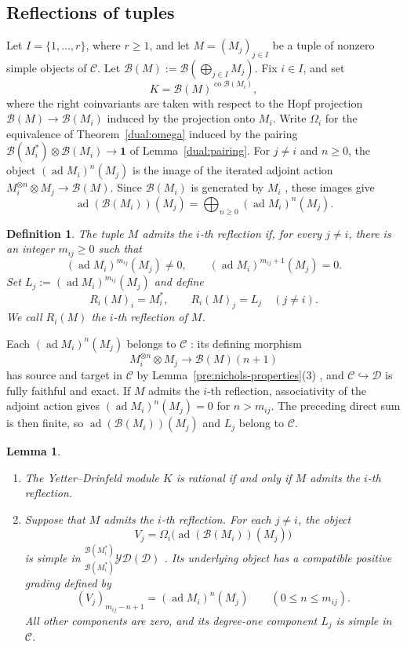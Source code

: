 \documentclass[11pt, a4paper]{article}
\numberwithin{equation}{section}
\newcommand{\C}{\mathcal C}
\newcommand{\D}{\mathcal D}
\newcommand{\B}{\mathcal B}
\newcommand{\YD}{\mathcal{YD}}
\newcommand{\one}{\mathbf 1}
\DeclareMathOperator{\ad}{ad}
\DeclareMathOperator{\co}{co}
\newtheorem{lemma}[theorem]{Lemma}
\newtheorem{definition}[theorem]{Definition}
\begin{document}
\subsection{Reflections of tuples}

Let $I=\{1,\ldots,{{r}}\}$, where ${{r}}\geq1$, and let
$M=(M_j)_{j\in I}$ be a tuple of nonzero simple objects of $\C$.
 Let
$
 \B(M):=\B\left(\bigoplus_{j\in I}M_j\right).
$
Fix $i\in I$, and set
\[
 K=\B(M)^{\co\B(M_i)},
\]
where the right coinvariants are taken with respect to the Hopf
projection $\B(M)\to\B(M_i)$ induced by the projection onto $M_i$.
Write $\Omega_i$ for the equivalence of
Theorem~\ref{dual:omega} induced by the pairing
$\B(M_i^*)\otimes\B(M_i)\to\one$ of
Lemma~\ref{dual:pairing}.
For $j\neq i$ and ${{n}}\geq0$, the object $(\ad M_i)^{{n}}(M_j)$ is the
image of the iterated adjoint action
$M_i^{\otimes {{n}}}\otimes M_j\to\B(M)$.
 {Since} $  \B(M_i)   $  {is generated by} $  M_i   $ {, these images give}
\[
 \ad(\B(M_i))(M_j)
 =\bigoplus_{{{n}}\geq0}(\ad M_i)^{{n}}(M_j).
\]

\begin{definition}\label{refl:finite}
The tuple $M$ {admits the $i$-th reflection if}, for every $j\neq i$, there is an
integer $m_{ij}\geq0$ such that
\[
 (\ad M_i)^{m_{ij}}(M_j)\neq0,\qquad
 (\ad M_i)^{m_{ij}+1}(M_j)=0.
\]
Set $L_j:=(\ad M_i)^{m_{ij}}(M_j)$ and define
\[
 R_i(M)_i=M_i^*,\qquad R_i(M)_j=L_j\quad(j\neq i)  .   
\]
We call $R_i(M)$ the $i$-th reflection of $M$.
\end{definition}

 {Each} $  (\ad M_i)^{{n}}(M_j)   $  {belongs to} $  \C   $ {: its defining morphism}
\[
 M_i^{\otimes {{n}}}\otimes M_j\longrightarrow\B(M)({{n}}+1)
\]
 {has source and target} in $\C$ by
Lemma~\ref{pre:nichols-properties}(3) {, and}
$\C  \hookrightarrow\D   $  {is fully faithful and exact}.
If $M$ {admits the $i$-th reflection}, associativity of the adjoint action gives
$(\ad M_i)^{{n}}(M_j)=0$ for ${{n}}>m_{ij}$.
 {The preceding direct sum is then finite, so}
$\ad(\B(M_i))(M_j)$  {and} $  L_j   $  {belong to} $\C$.

\begin{lemma}\label{refl:rational}
\begin{enumerate}
\item
The  {Yetter--Drinfeld module} $K$ is rational if and only if
$M$ {admits the $i$-th reflection}.

\item
Suppose that $M$ {admits the $i$-th reflection}. For each $j\neq i$, the object
\[
 V_j=\Omega_i\bigl(\ad(\B(M_i))(M_j)\bigr)
\]
is simple in ${}_{\B(M_i^*)}^{\B(M_i^*)}\YD(\D)$ {.
Its underlying object} has a compatible positive grading  {defined} by
\[
 (V_j)_{m_{ij}-{{n}}+1}=(\ad M_i)^{{n}}(M_j)
 \qquad(0\leq {{n}}\leq m_{ij}).
\]
 {All other components are zero, and its} degree-one component
$L_j$ is simple in $\C$.
\end{enumerate}
\end{lemma}
\end{document}
